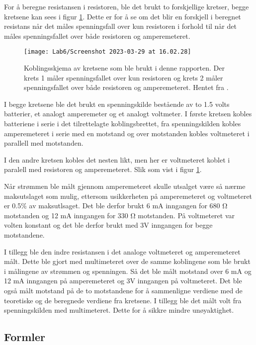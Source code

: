 \documentclass[twocolumn, a4paper, 11pt]{article} %
\begin{document}
For å beregne resistansen i resistoren, ble det brukt to forskjellige kretser, begge kretsene kan sees i figur \ref{krets}. Dette er for å se om det blir en forskjell i beregnet resistans når det måles spenningsfall over kun resistoren i forhold til når det måles spenningsfallet over både resistoren og amperemeteret.

\begin{figure}[H]
\centering
\texttt{[image: Lab6/Screenshot 2023-03-29 at 16.02.28]}
\caption{Koblingsskjema av kretsene som ble brukt i denne rapporten. Der krets 1 måler spenningsfallet over kun resistoren og krets 2 måler spenningsfallet over både resistoren og amperemeteret. Hentet fra \cite{oppgavetekst}.}
\label{krets}
\end{figure}


I begge kretsene ble det brukt en spenningskilde bestående av to 1.5 volts batterier, et analogt amperemeter og et analogt voltmeter. I første kretsen kobles batteriene i serie i det tilrettelagte koblingsbrettet, fra spenningskilden  kobles amperemeteret i serie med en motstand og over motstanden kobles voltmeteret i parallell med motstanden.

I den andre kretsen kobles det nesten likt, men her er voltmeteret koblet i paralell med resistoren og amperemeteret. Slik som vist i figur \ref{krets}.

Når strømmen ble målt gjennom amperemeteret skulle utsalget være så nærme maksutslaget som mulig, ettersom usikkerheten på amperemeteret og
voltmeteret er 0.5\% av maksutlsaget. Det ble derfor brukt 6 mA inngangen for 680 $\si{\ohm}$ motstanden og 12 mA inngangen for 330 $\si{\ohm}$ motstanden. På voltmeteret var volten konstant og det ble derfor brukt med 3V inngangen for begge motstandene.

I tillegg ble den indre resistansen i det analoge voltmeteret og amperemeteret målt. Dette ble gjort med multimeteret over de samme koblingene som ble brukt i målingene av strømmen og spenningen. Så det ble målt motstand over 6 mA og 12 mA inngangen på amperemeteret og 3V inngangen på voltmeteret. Det ble også målt motstand på de to motstandene for å sammenligne verdiene med de teoretiske og de beregnede verdiene fra kretsene. I tillegg ble det målt volt fra spenningskilden med multimeteret. Dette for å sikkre mindre unøyaktighet.



\subsection{Formler}
\end{document}
